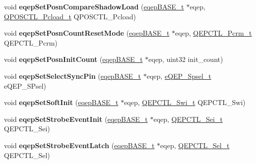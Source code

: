 \begin{DoxyCompactItemize}
void {\bfseries eqep\+Set\+Posn\+Compare\+Shadow\+Load} (\mbox{\hyperlink{reg__eqep_8h_a794db63555812863c39c5d214fd4f215}{eqep\+B\+A\+S\+E\+\_\+t}} $\ast$eqep, \mbox{\hyperlink{eqep_8h_aa1ff01381af29aa4f5c3f832436c7ee2}{Q\+P\+O\+S\+C\+T\+L\+\_\+\+Pcload\+\_\+t}} Q\+P\+O\+S\+C\+T\+L\+\_\+\+Pcload)
\item 
\mbox{\label{group__eQEP_ga832e3663c4a7546dee7bb3e09391e815}} 
void {\bfseries eqep\+Set\+Posn\+Count\+Reset\+Mode} (\mbox{\hyperlink{reg__eqep_8h_a794db63555812863c39c5d214fd4f215}{eqep\+B\+A\+S\+E\+\_\+t}} $\ast$eqep, \mbox{\hyperlink{eqep_8h_a2fe80bde268284b0d1d1357739c16461}{Q\+E\+P\+C\+T\+L\+\_\+\+Pcrm\+\_\+t}} Q\+E\+P\+C\+T\+L\+\_\+\+Pcrm)
\item 
\mbox{\label{group__eQEP_ga6f9459bcc045ab06997ccf51ac6b5041}} 
void {\bfseries eqep\+Set\+Posn\+Init\+Count} (\mbox{\hyperlink{reg__eqep_8h_a794db63555812863c39c5d214fd4f215}{eqep\+B\+A\+S\+E\+\_\+t}} $\ast$eqep, uint32 init\+\_\+count)
\item 
\mbox{\label{group__eQEP_gab1025a62c4af5a97dfcab304d3de8031}} 
void {\bfseries eqep\+Set\+Select\+Sync\+Pin} (\mbox{\hyperlink{reg__eqep_8h_a794db63555812863c39c5d214fd4f215}{eqep\+B\+A\+S\+E\+\_\+t}} $\ast$eqep, \mbox{\hyperlink{eqep_8h_afc2173b548889c9e522724c28d72cf83}{e\+Q\+E\+P\+\_\+\+Spsel\+\_\+t}} e\+Q\+E\+P\+\_\+\+S\+Psel)
\item 
\mbox{\label{group__eQEP_ga224be6d9d86e13b570512773d6578b87}} 
void {\bfseries eqep\+Set\+Soft\+Init} (\mbox{\hyperlink{reg__eqep_8h_a794db63555812863c39c5d214fd4f215}{eqep\+B\+A\+S\+E\+\_\+t}} $\ast$eqep, \mbox{\hyperlink{eqep_8h_a1fdb677f694a760fd5c6c48f4e2e68a1}{Q\+E\+P\+C\+T\+L\+\_\+\+Swi\+\_\+t}} Q\+E\+P\+C\+T\+L\+\_\+\+Swi)
\item 
\mbox{\label{group__eQEP_gaa57abb77df506eda4da33918eec1afaf}} 
void {\bfseries eqep\+Set\+Strobe\+Event\+Init} (\mbox{\hyperlink{reg__eqep_8h_a794db63555812863c39c5d214fd4f215}{eqep\+B\+A\+S\+E\+\_\+t}} $\ast$eqep, \mbox{\hyperlink{eqep_8h_a5dc92778c8ba021dec80dfd704526251}{Q\+E\+P\+C\+T\+L\+\_\+\+Sei\+\_\+t}} Q\+E\+P\+C\+T\+L\+\_\+\+Sei)
\item 
\mbox{\label{group__eQEP_gaff5299146e61b81b875122f5f13c0736}} 
void {\bfseries eqep\+Set\+Strobe\+Event\+Latch} (\mbox{\hyperlink{reg__eqep_8h_a794db63555812863c39c5d214fd4f215}{eqep\+B\+A\+S\+E\+\_\+t}} $\ast$eqep, \mbox{\hyperlink{eqep_8h_a509391511ea6a9b74effc7296a02ed1a}{Q\+E\+P\+C\+T\+L\+\_\+\+Sel\+\_\+t}} Q\+E\+P\+C\+T\+L\+\_\+\+Sel)

\end{DoxyCompactItemize}
